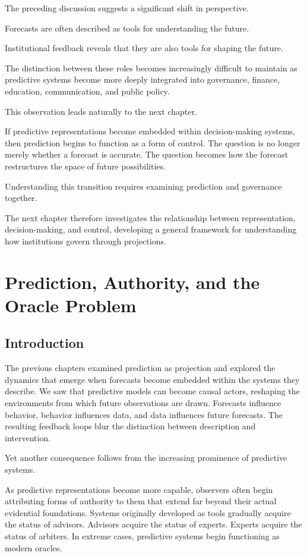 \documentclass[11pt,oneside,openany]{book}
\begin{document}
The preceding discussion suggests a significant shift in perspective.

Forecasts are often described as tools for understanding the future.

Institutional feedback reveals that they are also tools for shaping the future.

The distinction between these roles becomes increasingly difficult to maintain as predictive systems become more deeply integrated into governance, finance, education, communication, and public policy.

This observation leads naturally to the next chapter.

If predictive representations become embedded within decision-making systems, then prediction begins to function as a form of control. The question is no longer merely whether a forecast is accurate. The question becomes how the forecast restructures the space of future possibilities.

Understanding this transition requires examining prediction and governance together.

The next chapter therefore investigates the relationship between representation, decision-making, and control, developing a general framework for understanding how institutions govern through projections.

\chapter{Prediction, Authority, and the Oracle Problem}

\section{Introduction}

The previous chapters examined prediction as projection and explored the dynamics that emerge when forecasts become embedded within the systems they describe. We saw that predictive models can become causal actors, reshaping the environments from which future observations are drawn. Forecasts influence behavior, behavior influences data, and data influences future forecasts. The resulting feedback loops blur the distinction between description and intervention.

Yet another consequence follows from the increasing prominence of predictive systems.

As predictive representations become more capable, observers often begin attributing forms of authority to them that extend far beyond their actual evidential foundations. Systems originally developed as tools gradually acquire the status of advisors. Advisors acquire the status of experts. Experts acquire the status of arbiters. In extreme cases, predictive systems begin functioning as modern oracles.
\end{document}
